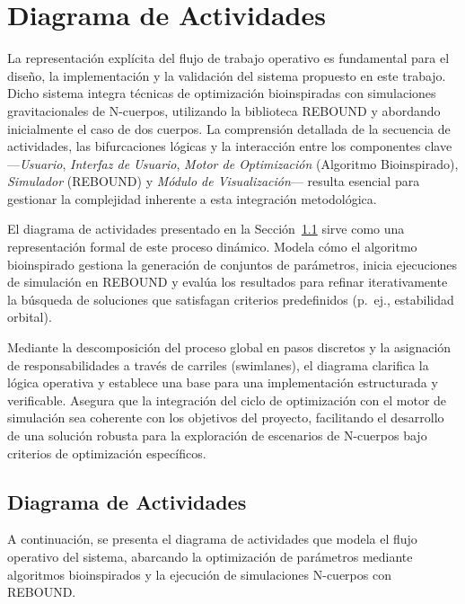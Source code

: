 \section{Diagrama de Actividades}%
\label{sec:diagrama_actividades} %

La representación explícita del flujo de trabajo operativo es fundamental para el diseño, la implementación y la validación del sistema propuesto en este trabajo. Dicho sistema integra técnicas de optimización bioinspiradas con simulaciones gravitacionales de N-cuerpos, utilizando la biblioteca REBOUND y abordando inicialmente el caso de dos cuerpos. La comprensión detallada de la secuencia de actividades, las bifurcaciones lógicas y la interacción entre los componentes clave —\textit{Usuario}, \textit{Interfaz de Usuario}, \textit{Motor de Optimización} (Algoritmo Bioinspirado), \textit{Simulador} (REBOUND) y \textit{Módulo de Visualización}— resulta esencial para gestionar la complejidad inherente a esta integración metodológica.

El diagrama de actividades presentado en la Sección~\ref{subsec:activity_diagram_img} sirve como una representación formal de este proceso dinámico. Modela cómo el algoritmo bioinspirado gestiona la generación de conjuntos de parámetros, inicia ejecuciones de simulación en REBOUND y evalúa los resultados para refinar iterativamente la búsqueda de soluciones que satisfagan criterios predefinidos (p.\ ej., estabilidad orbital).

Mediante la descomposición del proceso global en pasos discretos y la asignación de responsabilidades a través de carriles (swimlanes), el diagrama clarifica la lógica operativa y establece una base para una implementación estructurada y verificable. Asegura que la integración del ciclo de optimización con el motor de simulación sea coherente con los objetivos del proyecto, facilitando el desarrollo de una solución robusta para la exploración de escenarios de N-cuerpos bajo criterios de optimización específicos.

\subsection{Diagrama de Actividades}%
\label{subsec:activity_diagram_img}

A continuación, se presenta el diagrama de actividades que modela el flujo operativo del sistema, abarcando la optimización de parámetros mediante algoritmos bioinspirados y la ejecución de simulaciones N-cuerpos con REBOUND.\

